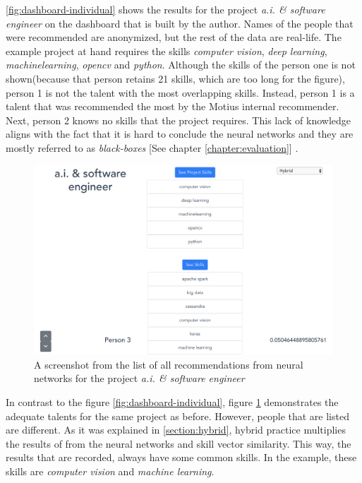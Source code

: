 \autoref{fig:dashboard-individual} shows the results for the project \textit{a.i. \& software engineer} on the dashboard that is built by the author. Names of the people that were recommended are anonymized, but the rest of the data are real-life. The example project at hand requires the skills \textit{computer vision}, \textit{deep learning}, \textit{machinelearning}, \textit{opencv} and \textit{python}. Although the skills of the person one is not shown(because that person retains 21 skills, which are too long for the figure), person 1 is not the talent with the most overlapping skills. Instead, person 1 is a talent that was recommended the most by the Motius internal recommender. Next, person 2 knows no skills that the project requires. This lack of knowledge aligns with the fact that it is hard to conclude the neural networks and they are mostly referred to as \textit{black-boxes} [See chapter \ref{chapter:evaluation}] \cite{benitez1997artificial}.

 \begin{figure}[htp]
	\centering
	\includegraphics[width=\textwidth]{figures/DashboardIndividualHybrid.png}
	\caption{A screenshot from the list of all recommendations from neural networks for the project \textit{a.i. \& software engineer}}
	\label{fig:dashboard-individual-hybrid}
\end{figure}

In contrast to the figure \ref{fig:dashboard-individual}, figure \ref{fig:dashboard-individual-hybrid} demonstrates the adequate talents for the same project as before. However, people that are listed are different. As it was explained in \ref{section:hybrid}, hybrid practice multiplies the results of from the neural networks and skill vector similarity. This way, the results that are recorded, always have some common skills. In the example, these skills are \textit{computer vision} and \textit{machine learning}.

